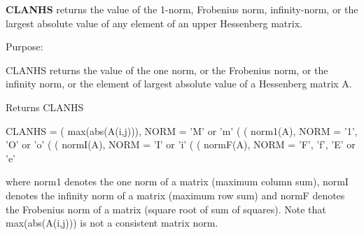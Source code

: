 {\bfseries C\+L\+A\+N\+H\+S} returns the value of the 1-\/norm, Frobenius norm, infinity-\/norm, or the largest absolute value of any element of an upper Hessenberg matrix. 

 \begin{DoxyParagraph}{Purpose\+: }
\begin{DoxyVerb} CLANHS  returns the value of the one norm,  or the Frobenius norm, or
 the  infinity norm,  or the  element of  largest absolute value  of a
 Hessenberg matrix A.\end{DoxyVerb}

\end{DoxyParagraph}
\begin{DoxyReturn}{Returns}
C\+L\+A\+N\+H\+S \begin{DoxyVerb}    CLANHS = ( max(abs(A(i,j))), NORM = 'M' or 'm'
             (
             ( norm1(A),         NORM = '1', 'O' or 'o'
             (
             ( normI(A),         NORM = 'I' or 'i'
             (
             ( normF(A),         NORM = 'F', 'f', 'E' or 'e'

 where  norm1  denotes the  one norm of a matrix (maximum column sum),
 normI  denotes the  infinity norm  of a matrix  (maximum row sum) and
 normF  denotes the  Frobenius norm of a matrix (square root of sum of
 squares).  Note that  max(abs(A(i,j)))  is not a consistent matrix norm.\end{DoxyVerb}
 
\end{DoxyReturn}

